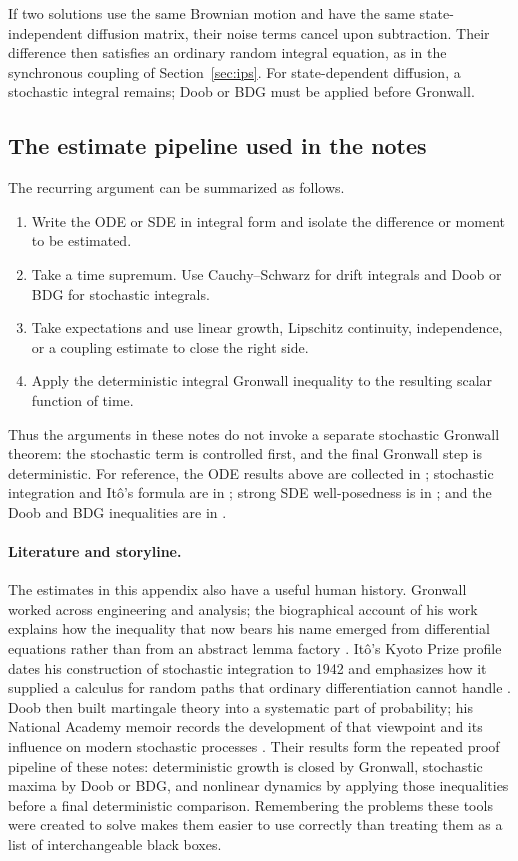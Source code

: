 \documentclass[11pt]{amsart}
\numberwithin{equation}{section}
\theoremstyle{plain}
\begin{document}
If two solutions use the same Brownian motion and have the same
state-independent diffusion matrix, their noise terms cancel upon
subtraction.  Their difference then satisfies an ordinary random integral
equation, as in the synchronous coupling of Section~\ref{sec:ips}.  For state-dependent
diffusion, a stochastic integral remains; Doob or BDG must be applied before
Gronwall.

\subsection{The estimate pipeline used in the notes}
The recurring argument can be summarized as follows.
\begin{enumerate}[leftmargin=*]
 \item Write the ODE or SDE in integral form and isolate the difference or
 moment to be estimated.
 \item Take a time supremum.  Use Cauchy--Schwarz for drift integrals and
 Doob or BDG for stochastic integrals.
 \item Take expectations and use linear growth, Lipschitz continuity,
 independence, or a coupling estimate to close the right side.
 \item Apply the deterministic integral Gronwall inequality to the resulting
 scalar function of time.
\end{enumerate}
Thus the arguments in these notes do not invoke a separate stochastic
Gronwall theorem: the stochastic term is controlled first, and the final
Gronwall step is deterministic.  For reference, the ODE results above are
collected in \cite[Chapter~2]{Teschl2012}; stochastic integration and It\^o's
formula are in \cite[Chapter~3]{KaratzasShreve1991}; strong SDE
well-posedness is in \cite[Chapter~5, Section~2]{KaratzasShreve1991}; and the
Doob and BDG inequalities are in
\cite[Chapter~II, Section~1 and Chapter~IV, Theorem~4.1]{RevuzYor1999}.

\paragraph{\textbf{Literature and storyline.}}
The estimates in this appendix also have a useful human history.  Gronwall
worked across engineering and analysis; the biographical account of his work
explains how the inequality that now bears his name emerged from differential
equations rather than from an abstract lemma factory
\cite{GronwallMacTutor}.  It\^o's Kyoto Prize profile dates his construction of
stochastic integration to 1942 and emphasizes how it supplied a calculus for
random paths that ordinary differentiation cannot handle
\cite{ItoKyotoPrize1998}.  Doob then built martingale theory into a systematic
part of probability; his National Academy memoir records the development of
that viewpoint and its influence on modern stochastic processes
\cite{DoobNASMemoir2016}.  Their results form the repeated proof pipeline of
these notes: deterministic growth is closed by Gronwall, stochastic maxima by
Doob or BDG, and nonlinear dynamics by applying those inequalities before a
final deterministic comparison.  Remembering the problems these tools were
created to solve makes them easier to use correctly than treating them as a
list of interchangeable black boxes.
\end{document}

